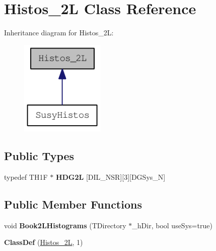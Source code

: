 \hypertarget{classHistos__2L}{
\section{Histos\_\-2L Class Reference}
\label{classHistos__2L}
}
Inheritance diagram for Histos\_\-2L:\nopagebreak
\begin{figure}[H]
\begin{center}
\leavevmode
\includegraphics[width=114pt]{classHistos__2L__inherit__graph}
\end{center}
\end{figure}
\subsection*{Public Types}
\begin{DoxyCompactItemize}
\item 
\hypertarget{classHistos__2L_a2c84fab5d2bb387af54bb39f789c2ec8}{
typedef TH1F $\ast$ {\bfseries HDG2L} \mbox{[}DIL\_\-NSR\mbox{]}\mbox{[}3\mbox{]}\mbox{[}DGSys\_\-N\mbox{]}}
\label{classHistos__2L_a2c84fab5d2bb387af54bb39f789c2ec8}

\end{DoxyCompactItemize}
\subsection*{Public Member Functions}
\begin{DoxyCompactItemize}
\item 
\hypertarget{classHistos__2L_ae055a4fb7aed73f03117b50e2093c3c8}{
void {\bfseries Book2LHistograms} (TDirectory $\ast$\_\-hDir, bool useSys=true)}
\label{classHistos__2L_ae055a4fb7aed73f03117b50e2093c3c8}

\item 
\hypertarget{classHistos__2L_a0676e1dd9d70c0b343da9caed055432a}{
{\bfseries ClassDef} (\hyperlink{classHistos__2L}{Histos\_\-2L}, 1)}
\label{classHistos__2L_a0676e1dd9d70c0b343da9caed055432a}

\end{DoxyCompactItemize}
